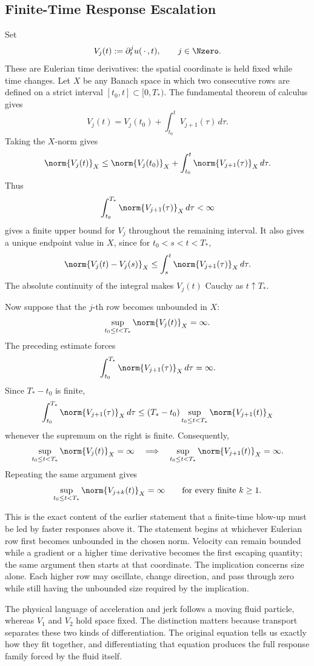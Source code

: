 
\subsection{Finite-Time Response Escalation}\label{sub:FiniteTimeResponseEscalation}

Set
\[
  V_j(t)
  :=
  \partial_t^j u(\,\cdot\,,t),
  \qquad
  j\in\Nzero.
\]
These are Eulerian time derivatives: the spatial coordinate is held fixed while time changes.
Let \(X\) be any Banach space in which two consecutive rows are defined on a strict interval \([t_0,t]\subset[0,T_*)\).
The fundamental theorem of calculus gives
\[
  V_j(t)
  =
  V_j(t_0)
  +
  \int_{t_0}^{t}V_{j+1}(\tau)\,d\tau.
\]
Taking the \(X\)-norm gives
\[
  \norm{V_j(t)}_X
  \leq
  \norm{V_j(t_0)}_X
  +
  \int_{t_0}^{t}\norm{V_{j+1}(\tau)}_X\,d\tau.
\]
Thus
\[
  \int_{t_0}^{T_*}\norm{V_{j+1}(\tau)}_X\,d\tau
  <
  \infty
\]
gives a finite upper bound for \(V_j\) throughout the remaining interval.
It also gives a unique endpoint value in \(X\), since for \(t_0<s<t<T_*\),
\[
  \norm{V_j(t)-V_j(s)}_X
  \leq
  \int_s^t\norm{V_{j+1}(\tau)}_X\,d\tau.
\]
The absolute continuity of the integral makes \(V_j(t)\) Cauchy as \(t\uparrow T_*\).

Now suppose that the \(j\)-th row becomes unbounded in \(X\):
\[
  \sup_{t_0\leq t<T_*}
  \norm{V_j(t)}_X
  =
  \infty.
\]
The preceding estimate forces
\[
  \int_{t_0}^{T_*}
  \norm{V_{j+1}(\tau)}_X
  \,d\tau
  =
  \infty.
\]
Since \(T_*-t_0\) is finite,
\[
  \int_{t_0}^{T_*}
  \norm{V_{j+1}(\tau)}_X
  \,d\tau
  \leq
  (T_*-t_0)
  \sup_{t_0\leq t<T_*}
  \norm{V_{j+1}(t)}_X
\]
whenever the supremum on the right is finite.
Consequently,
\[
  \sup_{t_0\leq t<T_*}
  \norm{V_j(t)}_X
  =
  \infty
  \quad\Longrightarrow\quad
  \sup_{t_0\leq t<T_*}
  \norm{V_{j+1}(t)}_X
  =
  \infty.
\]
Repeating the same argument gives
\[
  \sup_{t_0\leq t<T_*}
  \norm{V_{j+k}(t)}_X
  =
  \infty
  \qquad
  \text{for every finite }k\geq1.
\]

This is the exact content of the earlier statement that a finite-time blow-up must be led by faster responses above it.
The statement begins at whichever Eulerian row first becomes unbounded in the chosen norm.
Velocity can remain bounded while a gradient or a higher time derivative becomes the first escaping quantity; the same argument then starts at that coordinate.
The implication concerns size alone.
Each higher row may oscillate, change direction, and pass through zero while still having the unbounded size required by the implication.

The physical language of acceleration and jerk follows a moving fluid particle, whereas \(V_1\) and \(V_2\) hold space fixed.
The distinction matters because transport separates these two kinds of differentiation.
The original equation tells us exactly how they fit together, and differentiating that equation produces the full response family forced by the fluid itself.
